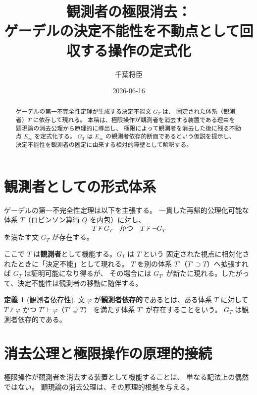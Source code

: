 \documentclass[11pt,a4paper]{article}
\title{観測者の極限消去：\\
ゲーデルの決定不能性を不動点として回収する操作の定式化}
\author{千葉将臣}
\date{2026-06-16}
\theoremstyle{definition}
\newtheorem{definition}{定義}[section]
\newcommand{\Einfty}{E_\infty}
\begin{document}
\maketitle

\begin{abstract}
ゲーデルの第一不完全性定理が生成する決定不能文 $G_T$ は、
固定された体系（観測者）$T$ に依存して現れる。
本稿は、極限操作が観測者を消去する装置である理由を
顕現論の消去公理から原理的に導出し、
極限によって観測者を消去した後に残る不動点 $\Einfty$ を定式化する。
$G_T$ は $\Einfty$ の観測者依存的断面であるという仮説を提示し、
決定不能性を観測者の固定に由来する相対的障壁として解釈する。
\end{abstract}

\section{観測者としての形式体系}

ゲーデルの第一不完全性定理は以下を主張する。
一貫した再帰的公理化可能な体系 $T$（ロビンソン算術 $Q$ を内包）に対し、
$$T \nvdash G_T \quad \text{かつ} \quad T \nvdash \neg G_T$$
を満たす文 $G_T$ が存在する。

ここで $T$ は\textbf{観測者}として機能する。$G_T$ は $T$ という
固定された視点に相対化されたときに「決定不能」として現れる。
$T$ を別の体系 $T'$（$T' \supset T$）へ拡張すれば $G_T$ は証明可能になり得るが、
その場合には $G_{T'}$ が新たに現れる。したがって、決定不能性は観測者の移動に随伴する。

\begin{definition}[観測者依存性]
文 $\varphi$ が\textbf{観測者依存的}であるとは、ある体系 $T$ に対して
$T \nvdash \varphi$ かつ $T' \vdash \varphi$（$T' \supsetneq T$）
を満たす体系 $T'$ が存在することをいう。
$G_T$ は観測者依存的である。
\end{definition}

\section{消去公理と極限操作の原理的接続}

極限操作が観測者を消去する装置として機能することは、
単なる記法上の偶然ではない。
顕現論の消去公理は、その原理的根拠を与える。
\end{document}
